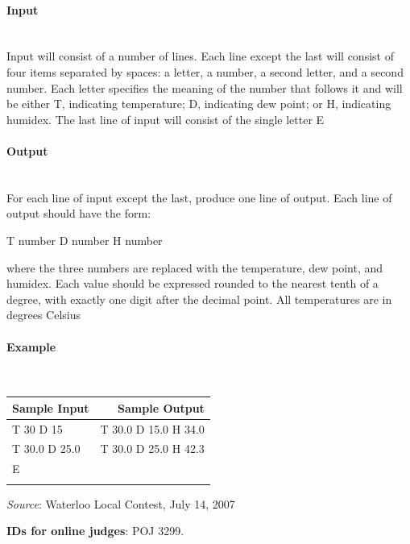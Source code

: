 \documentclass{article}
\begin{document}
\paragraph{Input} \mbox{} \\

Input will consist of a number of lines. Each line except the last will consist of four items separated
by spaces: a letter, a number, a second letter, and a second number. Each letter specifies the meaning of the number that follows it and will be either T, indicating temperature; D, indicating dew
point; or H, indicating humidex. The last line of input will consist of the single letter E

\paragraph{Output}\mbox{} \\

For each line of input except the last, produce one line of output. Each line of output should have
the form:
\begin{center}
T number D number H number
\end{center}
where the three numbers are replaced with the temperature, dew point, and humidex. Each value
should be expressed rounded to the nearest tenth of a degree, with exactly one digit after the decimal point. All temperatures are in degrees Celsius

\paragraph{Example}\mbox{} \\

\begin{table}[h]
    \centering
    \begin{tabular}{|l|r|}
        \hline
        \textbf{Sample Input} & \textbf{Sample Output} \\
        \hline
         T 30 D 15   & T 30.0 D 15.0 H 34.0  \\ 
         T 30.0 D 25.0   & T 30.0 D 25.0 H 42.3 \\ 
         E   &  \\ 
            &  \\ \hline
    \end{tabular}
\end{table}

\textit{Source}: Waterloo Local Contest, July 14, 2007

\textbf{IDs for online judges}: POJ 3299.
\end{document}

